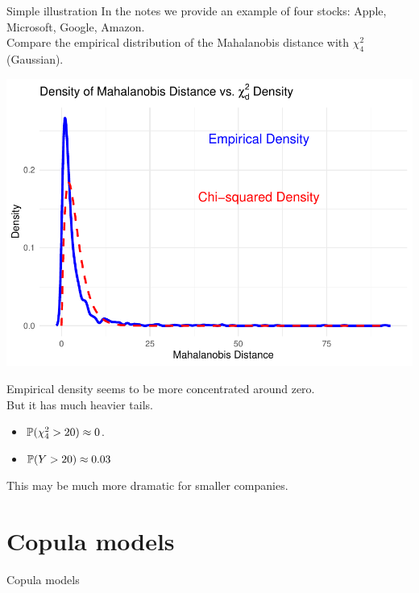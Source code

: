\documentclass[11pt,handout,aspectratio=169]{beamer}
\begin{document}
\begin{frame}[fragile]{Simple illustration}
In the notes we provide an example of four stocks: Apple, Microsoft, Google, Amazon.\\[3mm]
Compare the empirical distribution of the Mahalanobis distance with $\chi^2_4$ (Gaussian).\\[3mm]
\begin{minipage}{7cm}
	\includegraphics[scale=.5]{pics/SMN2.pdf}
\end{minipage}\begin{minipage}{8cm}
	Empirical density seems to be more concentrated around zero.\\[3mm]
	But it has much heavier tails. 
	\begin{itemize}
		\item $\P(\chi^2_4>20)\approx 0$. 
		\item $\P(Y>20)\approx 0.03$
	\end{itemize}
\end{minipage}
\smallskip

This may be much more dramatic for smaller companies.
\end{frame}



\section{Copula models}

\begin{frame}{}
	\begin{center}
		{\Huge \alert{Copula models}}
	\end{center}
\end{frame}
\end{document}
